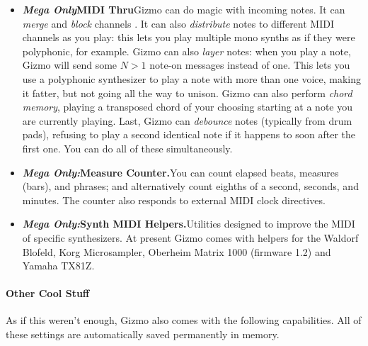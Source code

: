 \documentclass{article}
\begin{document}
\begin{itemize}
\item {\bf \textit{Mega Only}\quad MIDI Thru}\quad Gizmo can do magic with incoming notes.  It can {\it merge} and {\it block} channels%
.  It can also {\it distribute} notes to different MIDI channels as you play: this lets you play multiple mono synths as if they were polyphonic, for example.  Gizmo can also {\it layer} notes: when you play a note, Gizmo will send some \(N>1\) note-on messages instead of one.  This lets you use a polyphonic synthesizer to play a note with more than one voice, making it fatter, but not going all the way to unison.  Gizmo can also perform {\it chord memory}, playing a transposed chord of your choosing starting at a note you are currently playing.  Last, Gizmo can {\it debounce} notes (typically from drum pads), refusing to play a second identical note if it happens to soon after the first one.  You can do all of these simultaneously.

\item {\bf \textit{Mega Only:}\quad Measure Counter.}\quad You can count elapsed beats, measures (bars), and phrases; and alternatively count eighths of a second, seconds, and minutes.  The counter also responds to external MIDI clock directives.

\item {\bf \textit{Mega Only:}\quad Synth MIDI Helpers.}\quad Utilities designed to improve the MIDI of specific synthesizers.  At present Gizmo comes with helpers for the Waldorf Blofeld, Korg Microsampler, Oberheim Matrix 1000 (firmware 1.2) and Yamaha TX81Z.

\end{itemize}

\paragraph{Other Cool Stuff}

As if this weren't enough, Gizmo also comes with the following capabilities.  All of these settings are automatically saved permanently in memory.
\end{document}

